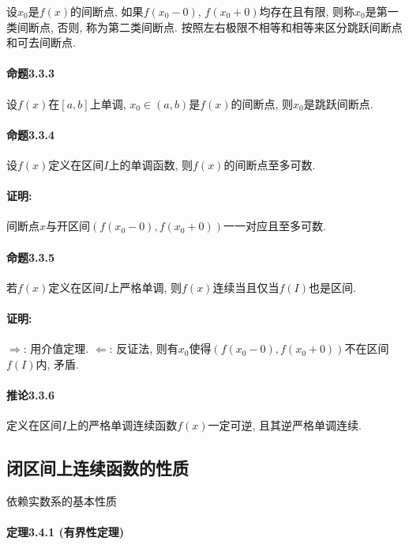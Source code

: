 设$x_{0}$是$f(x)$的间断点, 如果$f(x_{0}-0)$, $f(x_{0}+0)$均存在且有限, 则称$x_{0}$是第一类间断点,
否则, 称为第二类间断点. 按照左右极限不相等和相等来区分跳跃间断点和可去间断点.

\paragraph{命题3.3.3}

设$f(x)$在$[a,b]$上单调, $x_{0}\in\left(a,b\right)$是$f(x)$的间断点, 则$x_{0}$是跳跃间断点.

\paragraph{命题3.3.4}

设$f(x)$定义在区间$I$上的单调函数, 则$f(x)$的间断点至多可数.

\paragraph{证明:}

间断点$x$与开区间$\left(f(x_{0}-0),f(x_{0}+0)\right)$一一对应且至多可数.

\paragraph{命题3.3.5}

若$f(x)$定义在区间$I$上严格单调, 则$f(x)$连续当且仅当$f(I)$也是区间.

\paragraph{证明:}

$\Longrightarrow$: 用介值定理. $\Longleftarrow$: 反证法, 则有$x_{0}$使得$\left(f(x_{0}-0),f(x_{0}+0)\right)$不在区间$f(I)$内,
矛盾.

\paragraph{推论3.3.6}

定义在区间$I$上的严格单调连续函数$f(x)$一定可逆, 且其逆严格单调连续.

\subsection{闭区间上连续函数的性质}

依赖实数系的基本性质

\paragraph{定理3.4.1 (有界性定理)}

